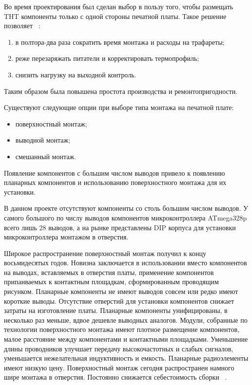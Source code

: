 
Во время проектирования был сделан выбор в пользу того, чтобы размещать
THT компоненты только с одной стороны печатной платы.
Такое решение позволяет ~\cite{yadro-habr-764056}:
\begin{enumerate}
\item в полтора-два раза сократить время монтажа и расходы на трафареты;
\item реже перезаряжать питатели и корректировать термопрофиль;  
\item снизить нагрузку на выходной контроль.
\end{enumerate}

Таким образом была повышена простота производства и ремонтопригодности.

Существуют следующие опции при выборе типа монтажа на печатной плате:
\begin{itemize}
\item поверхностный монтаж;
\item выводной монтаж;
\item смешанный монтаж.
\end{itemize}

Появление компонентов с большим числом выводов привело к появлению
планарных компонентов и использованию поверхностного монтажа для их
установки.

В данном проекте отсутствуют компоненты со столь большим числом
выводов. У самого большого по числу выводов компонентов
микроконтроллера ATmega328p всего лишь 28 выводов, а на рынке
представлены DIP корпуса для установки микроконтроллера
монтажом в отверстия.

Широкое распространение поверхностный монтаж получил к концу
восьмидесятых годов. Новизна заключается в использовании вместо
компонентов на выводах, вставляемых в отверстия платы, применение
компонентов припаиваемых к контактным площадкам, сформированным
проводящим рисунком. Планарные компоненты не имеют выводов совсем или
редко имеют короткие выводы. Отсутствие отверстий для установки
компонентов снижает затраты на изготовление платы. Планарные
компоненты унифицированы, в несколько раз меньше, вдвое дешевле
выводных аналогов. Модули, собранные по технологии поверхностного
монтажа имеют плотное размещение компонентов, малое расстояние между
компонентами и контактными площадками. Уменьшение длины проводников
улучшает передачу высокочастотных и слабых сигналов, уменьшается
нежелательная индуктивность и емкость. Планарные радиоэлементы имеют
низкую цену. Поверхностный монтаж сегодня распространен намного шире
монтажа в отверстия. Постоянно снижается себестоимость сборки
~\cite{платы.рф-монтаж}.

